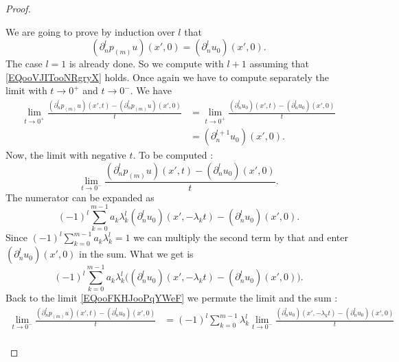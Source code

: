 \begin{proof}
\begin{subproof}
            We are going to prove by induction over \( l\) that
            \begin{equation}        \label{EQooVJITooNRgryX}
                (\partial_n^lp_{(m)}u)(x',0)=(\partial_n^lu_0)(x',0).
            \end{equation}
            The case \( l=1\) is already done. So we compute with \( l+1\) assuming that \eqref{EQooVJITooNRgryX} holds. Once again we have to compute separately the limit with \( t\to 0^+\) and \( t\to 0^-\). We have
            \begin{subequations}
                \begin{align}
                    \lim_{t\to 0^+} \frac{ (\partial_n^lp_{(m)}u)(x',t)-(\partial_n^lp_{(m)}u)(x',0) }{ t }&=\lim_{t\to 0^+} \frac{   (\partial_n^lu_0)(x',t)-  (\partial_n^lu_0)(x',0) }{ t }\\
                &=(\partial^{l+1}_nu_0)(x',0).
                \end{align}
            \end{subequations}
            Now, the limit with negative \( t\). To be computed :
            \begin{equation}    \label{EQooFKHJooPqYWeF}
                \lim_{t\to 0^-} \frac{ (\partial^l_np_{(m)}u)(x',t)-(\partial_n^lu_0)(x',0) }{ t }.
            \end{equation}
            The numerator can be expanded as
            \begin{equation}
                (-1)^l\sum_{k=0}^{m-1}a_k\lambda_k^l(\partial_n^lu_0)(x',-\lambda_kt)-(\partial_n^lu_0)(x',0).
            \end{equation}
            Since \( (-1)^l\sum_{k=0}^{m-1}a_k\lambda_k^l=1\) we can multiply the second term by that and enter \( (\partial_n^lu_0)(x',0)\) in the sum. What we get is
            \begin{equation}
                (-1)^l\sum_{k=0}^{m-1}a_k\lambda_k^l\big( (\partial_n^lu_0)(x',-\lambda_k t)-(\partial_{n}^lu_0)(x',0) \big).
            \end{equation}
            Back to the limit \eqref{EQooFKHJooPqYWeF} we permute the limit and the sum :
            \begin{subequations}
                \begin{align}
                    \lim_{t\to 0^-} \frac{ (\partial^l_np_{(m)}u)(x',t)-(\partial_n^lu_0)(x',0) }{ t }&=(-1)^l\sum_{k=0}^{m-1}\lambda_k^l\lim_{t\to 0^-} \frac{ (\partial_n^lu_0)(x',-\lambda_kt)-(\partial_n^lu_0)(x',0) }{ t }\\

\end{align}
\end{subequations}
\end{subproof}
\end{proof}
